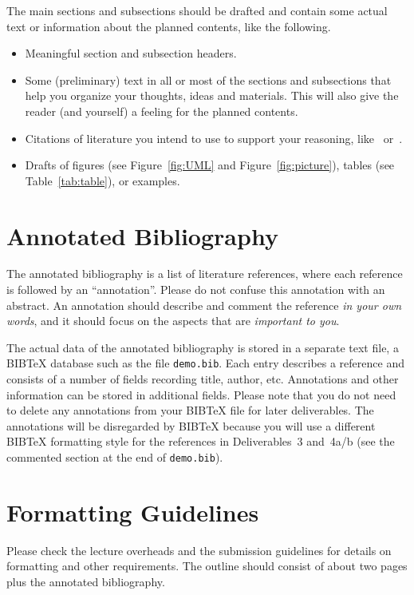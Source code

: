 \documentclass[runningheads,a4paper,oribibl]{llncs}
\begin{document}
The main sections and subsections should be drafted and contain some
actual text or information about the planned contents, like the
following.
\begin{itemize}
  \item Meaningful section and subsection headers.
  \item Some (preliminary) text in all or most of the sections and subsections
        that help you organize your thoughts, ideas and materials. This will
        also give the reader (and yourself) a feeling for the planned contents.
  \item Citations of literature you intend to use to support your reasoning,
        like~\cite{beck:1989} or~\cite{booch:1999,fleury:2000,thimbleby:1999}.
  \item Drafts of figures (see Figure~\ref{fig:UML} and Figure~\ref{fig:picture}),
        tables (see Table~\ref{tab:table}), or examples.
\end{itemize}


\section{Annotated Bibliography}\label{sec:bibl}
The annotated bibliography is a list of literature references, where each
reference is followed by an ``annotation''. Please do not confuse this
annotation with an abstract. An annotation should describe and comment
the reference \emph{in your own words}, and it should focus on the aspects that
are \emph{important to you}.

The actual data of the annotated bibliography is stored in a separate text file, a
BIBTeX database such as the file \texttt{demo.bib}. Each entry describes a reference
and consists of a number of fields recording title, author, etc. Annotations
and other information can be stored in additional fields. Please note that you do
not need to delete any annotations from your BIBTeX file for later deliverables.
The annotations will be disregarded by BIBTeX because you will use a different
BIBTeX formatting style for the references in Deliverables~3 and~4a/b
(see the commented section at the end of \texttt{demo.bib}).


\section{Formatting Guidelines}
Please check the lecture overheads and the submission guidelines for
details on formatting and other requirements. The outline should consist of
about two pages plus the annotated bibliography.
\end{document}
